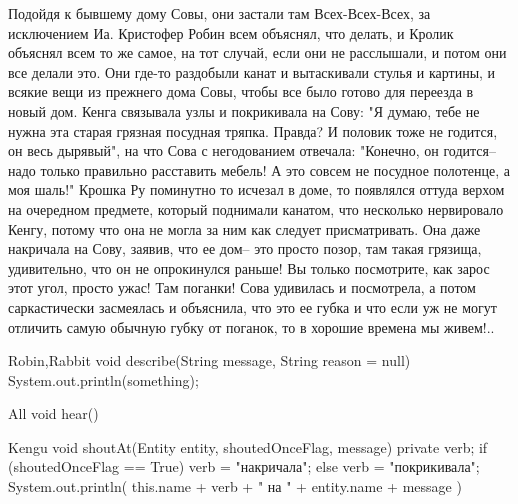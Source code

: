 Подойдя к бывшему дому Совы, они застали там Всех-Всех-Всех, за исключением Иа. 
Кристофер Робин всем объяснял, что делать, и Кролик объяснял всем то же самое, на тот случай, если они не расслышали, и потом они все делали это. 
Они где-то раздобыли канат и вытаскивали стулья и картины, и всякие вещи из прежнего дома Совы, чтобы все было готово для переезда в новый дом. 
Кенга связывала узлы и покрикивала на Сову: "Я думаю, тебе не нужна эта старая грязная посудная тряпка.  Правда? 
И половик тоже не годится, он весь дырявый", на что Сова с негодованием отвечала: "Конечно, он годится-- надо только правильно расставить мебель! 
А это совсем не посудное полотенце, а моя шаль!" 
Крошка Ру поминутно то исчезал в доме, то появлялся оттуда верхом на очередном предмете, который поднимали канатом, что несколько нервировало Кенгу, потому что она не могла за ним как следует присматривать. 
Она даже накричала на Сову, заявив, что ее дом-- это просто позор, там такая грязища, удивительно, что он не опрокинулся раньше! 
Вы только посмотрите, как зарос этот угол, просто ужас!  Там поганки! 
Сова удивилась и посмотрела, а потом саркастически засмеялась и объяснила, что это ее губка и что если уж не могут отличить самую обычную губку от поганок, то в хорошие времена мы живем!..


Robin,Rabbit {
	void describe(String message, String reason = null){
		System.out.println(something);
	}
}

All {
	void hear()
}

Kengu {
	void shoutAt(Entity entity, shoutedOnceFlag, message) {
		private verb;
		if (shoutedOnceFlag == True) {
			verb = "накричала";
		} else {
			verb = "покрикивала";
		}
		System.out.println(
				this.name + verb + " на " 
				+ entity.name 
				+ message
		)
	}
}
